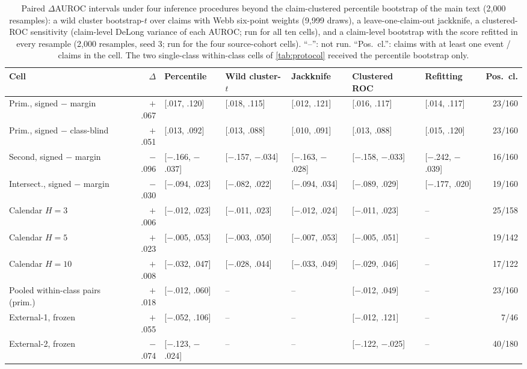 \documentclass[11pt]{article}
\begin{document}
\begin{table}[!t]\centering\scriptsize
\setlength{\tabcolsep}{3pt}
\begin{tabular}{@{}lrlllllr@{}}
\toprule
Cell & $\Delta$ & Percentile & Wild cluster-$t$ & Jackknife & Clustered ROC & Refitting & Pos.\ cl. \\
\midrule
Prim., signed $-$ margin & $+$.067 & [.017, .120] & [.018, .115] & [.012, .121] & [.016, .117] & [.014, .117] & 23/160 \\
Prim., signed $-$ class-blind & $+$.051 & [.013, .092] & [.013, .088] & [.010, .091] & [.013, .088] & [.015, .120] & 23/160 \\
Second, signed $-$ margin & $-$.096 & [$-$.166, $-$.037] & [$-$.157, $-$.034] & [$-$.163, $-$.028] & [$-$.158, $-$.033] & [$-$.242, $-$.039] & 16/160 \\
Intersect., signed $-$ margin & $-$.030 & [$-$.094, .023] & [$-$.082, .022] & [$-$.094, .034] & [$-$.089, .029] & [$-$.177, .020] & 19/160 \\
Calendar $H{=}3$ & $+$.006 & [$-$.012, .023] & [$-$.011, .023] & [$-$.012, .024] & [$-$.011, .023] & -- & 25/158 \\
Calendar $H{=}5$ & $+$.023 & [$-$.005, .053] & [$-$.003, .050] & [$-$.007, .053] & [$-$.005, .051] & -- & 19/142 \\
Calendar $H{=}10$ & $+$.008 & [$-$.032, .047] & [$-$.028, .044] & [$-$.033, .049] & [$-$.029, .046] & -- & 17/122 \\
\midrule
Pooled within-class pairs (prim.) & $+$.018 & [$-$.012, .060] & -- & -- & [$-$.012, .049] & -- & 23/160 \\
External-1, frozen & $+$.055 & [$-$.052, .106] & -- & -- & [$-$.012, .121] & -- & 7/46 \\
External-2, frozen & $-$.074 & [$-$.123, $-$.024] & -- & -- & [$-$.122, $-$.025] & -- & 40/180 \\
\bottomrule
\end{tabular}
\caption{Paired $\Delta$AUROC intervals under four inference procedures beyond the claim-clustered
percentile bootstrap of the main text (2{,}000 resamples): a wild cluster bootstrap-$t$ over
claims with Webb six-point weights (9{,}999 draws), a leave-one-claim-out jackknife, a clustered-ROC
sensitivity (claim-level DeLong variance of each AUROC; run for all ten cells), and a claim-level
bootstrap with the score refitted in every resample (2{,}000 resamples, seed 3; run for the four
source-cohort cells). ``--'': not run. ``Pos.\ cl.'': claims with at least one event / claims in
the cell. The two single-class within-class cells of \cref{tab:protocol} received the percentile
bootstrap only.}
\label{tab:wild}
\end{table}
\end{document}
